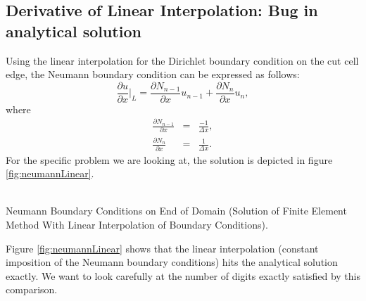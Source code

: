 \documentclass[a4paper,12pt]{article}
\makeatletter
\newenvironment{figurehere}
  {\def\@captype{figure}}
  {}
\makeatother
\begin{document}
\subsection{Derivative of Linear Interpolation: Bug in analytical solution}
Using the linear interpolation for the Dirichlet boundary condition on the cut cell edge, the Neumann boundary condition can be expressed as follows:
\begin{equation}
 \frac{\partial u}{\partial x}\vert_L = \frac{\partial N_{n-1}}{\partial x}u_{n-1}+\frac{\partial N_n}{\partial x}u_n,
\end{equation}
where
\begin{eqnarray}
\frac{\partial N_{n-1}}{\partial x} &=& \frac{-1}{\Delta x},\\
\frac{\partial N_n}{\partial x} &=&  \frac{1}{\Delta x}.
\end{eqnarray}
For the specific problem we are looking at, the solution is depicted in figure \ref{fig:neumannLinear}.
\begin{center}
\begin{figurehere} 
\\
\caption{Neumann Boundary Conditions on End of Domain (Solution of Finite Element Method With Linear Interpolation of Boundary Conditions).}\label{fig:neumannLinear}
\end{figurehere}
\end{center}
Figure \ref{fig:neumannLinear} shows that the linear interpolation (constant imposition of the Neumann boundary conditions) hits the analytical solution exactly. We want to look carefully at the number of digits exactly satisfied by this comparison.
\end{document}
